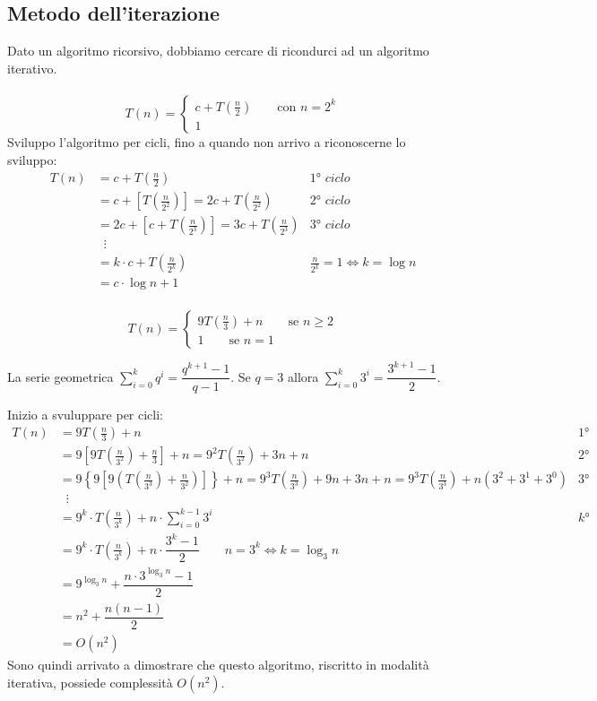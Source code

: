 \documentclass[italian]{article}
\newcommand{\varOmicron}{O}
\newcommand{\example}{\text{\faCircleArrowRight $\;$ Esempio }}
\begin{document}
\subsection{Metodo dell'iterazione}
Dato un algoritmo ricorsivo, dobbiamo cercare di ricondurci ad un algoritmo iterativo. \\\\
\example
\[
	T(n) =
	\begin{cases*}
		c + T(\frac{n}{2}) \qquad \text{con } n=2^k\\
		1
	\end{cases*}
\]
Sviluppo l'algoritmo per cicli, fino a quando non arrivo a riconoscerne lo sviluppo:
\begin{align*}
	T(n) &= c + T(\frac{n}{2}) & \textit{1° ciclo} \\
	&= c + \left[ T(\frac{n}{2^2}) \right] = 2c + T(\frac{n}{2^2}) & \textit{2° ciclo} \\
	&= 2c + \left[ c + T(\frac{n}{2^3}) \right] = 3c + T(\frac{n}{2^3}) &\textit{3° ciclo} \\
	&\;\;\vdots \\
	&= k\cdot c + T(\frac{n}{2^k}) & \frac{n}{2^k} = 1 \iff k = \log n \\
	&= c\cdot \log n + 1
\end{align*}
\example \\
\[
	T(n) =
	\begin{cases*}
		9T(\frac{n}{3}) + n \qquad \text{se } n \geq 2 \\
		1 \qquad \text{se } n=1
	\end{cases*}
\]

\begin{mdframed}
	La serie geometrica $\sum_{i=0}^{k} q^i = \dfrac{q^{k+1}-1}{q-1}$. Se $q=3$ allora $\sum_{i=0}^{k} 3^i = \dfrac{3^{k+1}-1}{2}$.
\end{mdframed}

Inizio a svuluppare per cicli:
\begin{align*}
	T(n) &= 9T(\frac{n}{3}) + n & \textit{1° ciclo} \\
	&= 9\left[ 9T\left(\frac{n}{3^2}\right) + \frac{n}{3} \right] + n = 9^2T \left(\frac{n}{3^2}\right) + 3n + n  & \textit{2° ciclo}\\
	&= 9\left\{ 9 \left[ 9 \left(T \left(\frac{n}{3^3}\right) + \frac{n}{3^2}\right) \right] \right\} + n = 9^3T \left(\frac{n}{3^3}\right) + 9n + 3n + n = 9^3T \left(\frac{n}{3^3}\right) + n(3^2+3^1+3^0)  & \textit{3° ciclo}\\
	&\;\;\vdots \\
	&= 9^k\cdot T(\frac{n}{3^k}) + n\cdot \sum_{i=0}^{k-1} 3^i  & \textit{k° ciclo}\\
	&=  9^k\cdot T(\frac{n}{3^k}) + n\cdot \dfrac{3^k-1}{2} \qquad n=3^k \iff k =\log_3n\\
	&= 9^{\log_3n} + \dfrac{n\cdot 3^{\log_3n}-1}{2} \\
	&= n^2 + \dfrac{n(n-1)}{2} \\
	&= \varOmicron(n^2)
\end{align*}
Sono quindi arrivato a dimostrare che questo algoritmo, riscritto in modalità iterativa, possiede complessità $\varOmicron(n^2)$.
\end{document}
